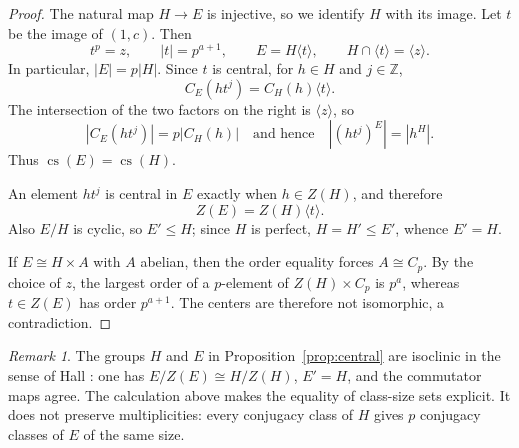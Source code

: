 \documentclass[11pt]{amsart}
\theoremstyle{remark}
\newtheorem{remark}[theorem]{Remark}
\newcommand{\cs}{\operatorname{cs}}
\begin{document}
\begin{proof}
The natural map \(H\to E\) is injective, so we identify \(H\) with its
image.  Let \(t\) be the image of \((1,c)\).  Then
\[
t^p=z,\qquad |t|=p^{a+1},\qquad
E=H\langle t\rangle,\qquad H\cap\langle t\rangle=\langle z\rangle.
\]
In particular, \(|E|=p|H|\).  Since \(t\) is central, for
\(h\in H\) and \(j\in\mathbb Z\),
\[
C_E(ht^j)=C_H(h)\langle t\rangle.
\]
The intersection of the two factors on the right is \(\langle z\rangle\),
so
\[
|C_E(ht^j)|=p|C_H(h)|
\quad\text{and hence}\quad
|(ht^j)^E|=|h^H|.
\]
Thus \(\cs(E)=\cs(H)\).

An element \(ht^j\) is central in \(E\) exactly when \(h\in Z(H)\), and
therefore
\[
Z(E)=Z(H)\langle t\rangle.
\]
Also \(E/H\) is cyclic, so \(E'\le H\); since \(H\) is perfect,
\(H=H'\le E'\), whence \(E'=H\).

If \(E\cong H\times A\) with \(A\) abelian, then the order equality forces
\(A\cong C_p\).  By the choice of \(z\), the largest order of a
\(p\)-element of \(Z(H)\times C_p\) is \(p^a\), whereas
\(t\in Z(E)\) has order \(p^{a+1}\).  The centers are therefore not
isomorphic, a contradiction.
\end{proof}

\begin{remark}
The groups \(H\) and \(E\) in Proposition~\ref{prop:central} are isoclinic
in the sense of Hall \cite{Hall}: one has
\(E/Z(E)\cong H/Z(H)\), \(E'=H\), and the commutator maps agree.  The
calculation above makes the equality of class-size sets explicit.  It does
not preserve multiplicities: every conjugacy class of \(H\) gives \(p\)
conjugacy classes of \(E\) of the same size.
\end{remark}
\end{document}
